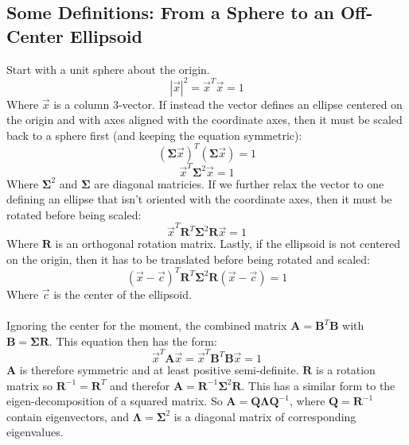 \documentclass{article}
\def\mat#1{\mathbf{#1}}
\begin{document}
\subsection{Some Definitions: From a Sphere to an Off-Center Ellipsoid}
Start with a unit sphere about the origin. 
\begin{equation}
\left| \vec{x} \right |^2 = \vec{x}^T \vec{x} = 1
\end{equation}
Where $\vec{x}$ is a column 3-vector. If instead the vector defines an ellipse centered on the origin and with axes aligned with the coordinate axes, then it must be scaled back to a sphere first (and keeping the equation symmetric):
\begin{equation}
(\mat{\Sigma}\vec{x})^T (\mat{\Sigma}\vec{x}) = 1
\end{equation}
\begin{equation}
\vec{x}^T \mat{\Sigma}^2 \vec{x} = 1
\end{equation}
Where $\mat{\Sigma}^2$ and $\mat{\Sigma}$ are diagonal matricies.  If we further relax the vector to one defining an ellipse that isn't oriented with the coordinate axes, then it must be rotated before being scaled:
\begin{equation}
\vec{x}^T \mat{R}^T \mat{\Sigma}^2 \mat{R} \vec{x} = 1
\end{equation}
Where $\mat{R}$ is an orthogonal rotation matrix.  Lastly, if the ellipsoid is not centered on the origin, then it has to be translated before being rotated and scaled:
\begin{equation}
(\vec{x}-\vec{c})^T \mat{R}^T \mat{\Sigma}^2 \mat{R} (\vec{x}-\vec{c}) = 1
\end{equation}
Where $\vec{c}$ is the center of the ellipsoid.\\
\\
Ignoring the center for the moment, the combined matrix $\mat{A} = \mat{B}^T\mat{B}$ with $\mat{B} = \mat{\Sigma} \mat{R}$. This equation then has the form:
\begin{equation}
\vec{x}^T \mat{A} \vec{x} = \vec{x}^T \mat{B}^T \mat{B} \vec{x} = 1
\end{equation}
$\mat{A}$ is therefore symmetric and at least positive semi-definite. $\mat{R}$ is a rotation matrix so $\mat{R}^{-1} = \mat{R}^T$ and therefor
$\mat{A} = \mat{R}^{-1}\mat{\Sigma}^2\mat{R}$. This has a similar form
to the eigen-decomposition of a squared matrix. So $\mat{A} = \mat{Q}\mat{\Lambda}\mat{Q}^{-1}$,
where $\mat{Q} = \mat{R}^{-1}$ contain eigenvectors, and $\mat{\Lambda} = \mat{\Sigma}^2$ is a
diagonal matrix of corresponding eigenvalues.
\end{document}
